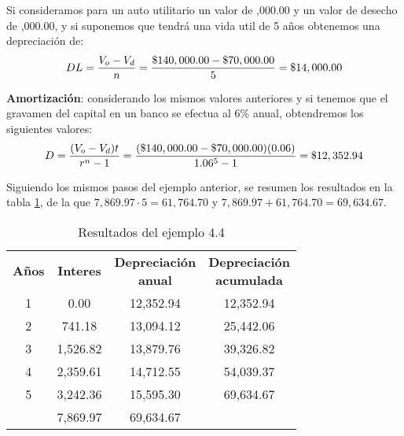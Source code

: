 \begin{example}
    Si consideramos para un auto utilitario un valor de ,000.00 y un valor de desecho de ,000.00, y si suponemos que
    tendrá una vida util de 5 años obtenemos una depreciación de:
    \[DL=\frac{V_o-V_d}{n}=\frac{\text{\textdollar}140,000.00-\text{\textdollar}70,000.00}{5}=\text{\textdollar}14,000.00\]

    \textbf{Amortización}: considerando los mismos valores anteriores y si tenemos que el gravamen del capital en un banco se efectua al 6\% anual,
    obtendremos los siguientes valores:
    \[D=\frac{(V_o-V_d)t}{r^n-1}=\frac{(\text{\textdollar}140,000.00-\text{\textdollar}70,000.00)(0.06)}{1.06^5-1}=\text{\textdollar}12,352.94\]

    Siguiendo los mismos pasos del ejemplo anterior, se resumen los resultados en la tabla \ref{tab:ejemplo2pdf}, de la que $7,869.97\cdot5=61,764.70$ y $7,869.97+61,764.70=69,634.67$.
    \begin{table}
        \centering
        \begin{tabular}{c c c c}
            \textbf{Años} & \textbf{Interes} & \makecell{\textbf{Depreciación}\\\textbf{anual}} & \makecell{\textbf{Depreciación}\\\textbf{acumulada}} \\
            1 & 0.00 & 12,352.94 & 12,352.94 \\
            2 & 741.18 & 13,094.12 & 25,442.06 \\
            3 & 1,526.82 & 13,879.76 & 39,326.82 \\
            4 & 2,359.61 & 14,712.55 & 54,039.37 \\
            5 & 3,242.36 & 15,595.30 & 69,634.67 \\
            \cline{2-3}
            & 7,869.97 & 69,634.67 &
        \end{tabular}
        \caption{Resultados del ejemplo 4.4}
        \label{tab:ejemplo2pdf}
    \end{table}
\end{example}